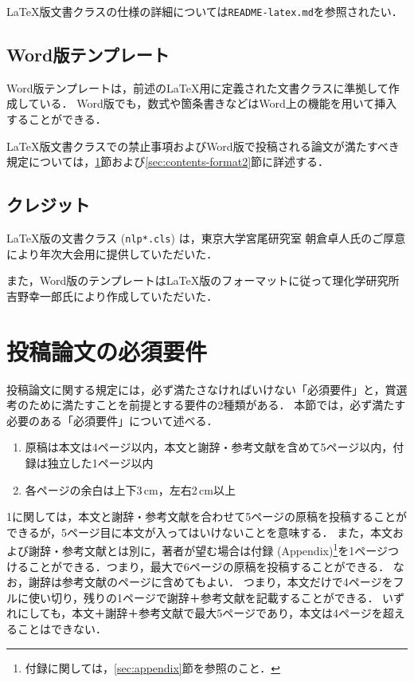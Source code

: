 \documentclass[
  platex, dvipdfmx,  %
]{nlp2026}
\newcommand{\code}[1]{\texttt{#1}}
\begin{document}
LaTeX版文書クラスの仕様の詳細については\code{README-latex.md}を参照されたい．


\subsection{Word版テンプレート}
Word版テンプレートは，前述のLaTeX用に定義された文書クラスに準拠して作成している．
Word版でも，数式や箇条書きなどはWord上の機能を用いて挿入することができる．

LaTeX版文書クラスでの禁止事項およびWord版で投稿される論文が満たすべき規定については，\ref{sec:contents-format1}節および\ref{sec:contents-format2}節に詳述する．


\subsection{クレジット}
LaTeX版の文書クラス (\code{nlp*.cls}) は，東京大学宮尾研究室 朝倉卓人氏のご厚意により年次大会用に提供していただいた．

また，Word版のテンプレートはLaTeX版のフォーマットに従って理化学研究所 吉野幸一郎氏により作成していただいた．




\section{投稿論文の必須要件}
\label{sec:contents-format1}

投稿論文に関する規定には，必ず満たさなければいけない「必須要件」と，賞選考のために満たすことを前提とする要件の2種類がある．
本節では，必ず満たす必要のある「必須要件」について述べる．

\begin{enumerate}
\item 原稿は本文は4ページ以内，本文と謝辞・参考文献を含めて5ページ以内，付録は独立した1ページ以内
\item 各ページの余白は上下3\,cm，左右2\,cm以上
\end{enumerate}

1に関しては，本文と謝辞・参考文献を合わせて5ページの原稿を投稿することができるが，5ページ目に本文が入ってはいけないことを意味する．
また，本文および謝辞・参考文献とは別に，著者が望む場合は付録 (Appendix)\footnote{付録に関しては，\ref{sec:appendix}節を参照のこと．}を1ページつけることができる．つまり，最大で6ページの原稿を投稿することができる．
なお，謝辞は参考文献のページに含めてもよい．
つまり，本文だけで4ページをフルに使い切り，残りの1ページで謝辞＋参考文献を記載することができる．
いずれにしても，本文＋謝辞＋参考文献で最大5ページであり，本文は4ページを超えることはできない．
\end{document}
